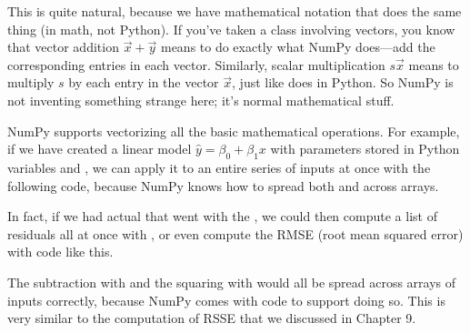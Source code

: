 \documentclass[letterpaper,10pt,english]{jupyterBook}
\begin{document}
\sphinxAtStartPar
This is quite natural, because we have mathematical notation that does the same thing (in math, not Python).  If you’ve taken a class involving vectors, you know that vector addition \(\vec x+\vec y\) means to do exactly what NumPy does—add the corresponding entries in each vector.  Similarly, scalar multiplication \(s\vec x\) means to multiply \(s\) by each entry in the vector \(\vec x\), just like  does in Python.  So NumPy is not inventing something strange here; it’s normal mathematical stuff.

\sphinxAtStartPar
NumPy supports vectorizing all the basic mathematical operations.  For example, if we have created a linear model \(\hat y=\beta_0+\beta_1 x\) with parameters stored in Python variables  and , we can apply it to an entire series of inputs  at once with the following code, because NumPy knows how to spread both \sphinxcode{\sphinxupquote{+}} and \sphinxcode{\sphinxupquote{*}} across arrays.

\begin{sphinxVerbatim}[commandchars=\\\{\}]
      
\end{sphinxVerbatim}

\sphinxAtStartPar
In fact, if we had actual  that went with the , we could then compute a list of residuals all at once with , or even compute the RMSE (root mean squared error) with code like this.

\begin{sphinxVerbatim}[commandchars=\\\{\}]
              
\end{sphinxVerbatim}

\sphinxAtStartPar
The subtraction with \sphinxcode{\sphinxupquote{\sphinxhyphen{}}} and the squaring with  would all be spread across arrays of inputs correctly, because NumPy comes with code to support doing so.  This is very similar to the computation of RSSE that we discussed in Chapter 9.
\end{document}
